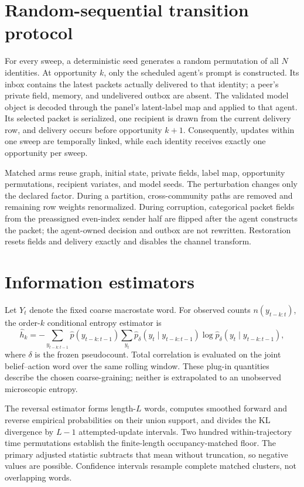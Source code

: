 \documentclass[12pt]{article}
\begin{document}
\appendix
\section{Random-sequential transition protocol}

For every sweep, a deterministic seed generates a random permutation of all
$N$ identities. At opportunity $k$, only the scheduled agent's prompt is
constructed. Its inbox contains the latest packets actually delivered to that
identity; a peer's private field, memory, and undelivered outbox are absent.
The validated model object is decoded through the panel's latent-label map and
applied to that agent. Its selected packet is serialized, one recipient is
drawn from the current delivery row, and delivery occurs before opportunity
$k+1$. Consequently, updates within one sweep are temporally linked, while
each identity receives exactly one opportunity per sweep.

Matched arms reuse graph, initial state, private fields, label map, opportunity
permutations, recipient variates, and model seeds. The perturbation changes
only the declared factor. During a partition, cross-community paths are
removed and remaining row weights renormalized. During corruption, categorical
packet fields from the preassigned even-index sender half are flipped after
the agent constructs the packet; the agent-owned decision and outbox are not
rewritten. Restoration resets fields and delivery exactly and disables the
channel transform.

\section{Information estimators}

Let $Y_t$ denote the fixed coarse macrostate word. For observed counts
$n(y_{t-k:t})$, the order-$k$ conditional entropy estimator is
\begin{equation}
\widehat h_k=-\sum_{y_{t-k:t-1}}\widehat p(y_{t-k:t-1})
\sum_{y_t}\widehat p_{\delta}(y_t\mid y_{t-k:t-1})
\log \widehat p_{\delta}(y_t\mid y_{t-k:t-1}),
\end{equation}
where $\delta$ is the frozen pseudocount. Total correlation is evaluated on
the joint belief--action word over the same rolling window. These plug-in
quantities describe the chosen coarse-graining; neither is extrapolated to an
unobserved microscopic entropy.

The reversal estimator forms length-$L$ words, computes smoothed forward and
reverse empirical probabilities on their union support, and divides the KL
divergence by $L-1$ attempted-update intervals. Two hundred within-trajectory
time permutations establish the finite-length occupancy-matched floor. The
primary adjusted statistic subtracts that mean without truncation, so negative
values are possible. Confidence intervals resample complete matched clusters,
not overlapping words.
\end{document}
